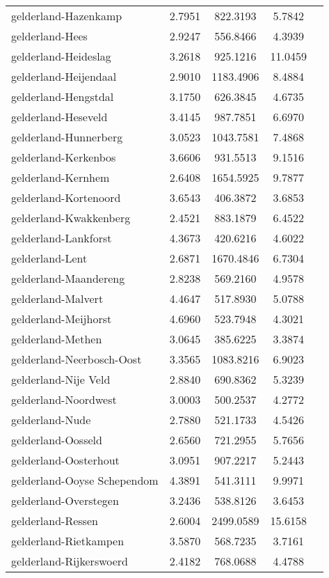 \begin{longtable}{llccc}
gelderland-Hazenkamp & 2.7951 & 822.3193 & 5.7842 \\
gelderland-Hees & 2.9247 & 556.8466 & 4.3939 \\
gelderland-Heideslag & 3.2618 & 925.1216 & 11.0459 \\
gelderland-Heijendaal & 2.9010 & 1183.4906 & 8.4884 \\
gelderland-Hengstdal & 3.1750 & 626.3845 & 4.6735 \\
gelderland-Heseveld & 3.4145 & 987.7851 & 6.6970 \\
gelderland-Hunnerberg & 3.0523 & 1043.7581 & 7.4868 \\
gelderland-Kerkenbos & 3.6606 & 931.5513 & 9.1516 \\
gelderland-Kernhem & 2.6408 & 1654.5925 & 9.7877 \\
gelderland-Kortenoord & 3.6543 & 406.3872 & 3.6853 \\
gelderland-Kwakkenberg & 2.4521 & 883.1879 & 6.4522 \\
gelderland-Lankforst & 4.3673 & 420.6216 & 4.6022 \\
gelderland-Lent & 2.6871 & 1670.4846 & 6.7304 \\
gelderland-Maandereng & 2.8238 & 569.2160 & 4.9578 \\
gelderland-Malvert & 4.4647 & 517.8930 & 5.0788 \\
gelderland-Meijhorst & 4.6960 & 523.7948 & 4.3021 \\
gelderland-Methen & 3.0645 & 385.6225 & 3.3874 \\
gelderland-Neerbosch-Oost & 3.3565 & 1083.8216 & 6.9023 \\
gelderland-Nije Veld & 2.8840 & 690.8362 & 5.3239 \\
gelderland-Noordwest & 3.0003 & 500.2537 & 4.2772 \\
gelderland-Nude & 2.7880 & 521.1733 & 4.5426 \\
gelderland-Oosseld & 2.6560 & 721.2955 & 5.7656 \\
gelderland-Oosterhout & 3.0951 & 907.2217 & 5.2443 \\
gelderland-Ooyse Schependom & 4.3891 & 541.3111 & 9.9971 \\
gelderland-Overstegen & 3.2436 & 538.8126 & 3.6453 \\
gelderland-Ressen & 2.6004 & 2499.0589 & 15.6158 \\
gelderland-Rietkampen & 3.5870 & 568.7235 & 3.7161 \\
gelderland-Rijkerswoerd & 2.4182 & 768.0688 & 4.4788 \\

\end{longtable}

